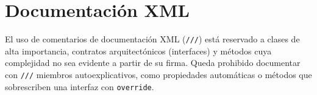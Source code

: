 \section{Documentación XML}

El uso de comentarios de documentación XML (\texttt{///}) está reservado a clases de alta importancia, contratos arquitectónicos (interfaces) y métodos cuya complejidad no sea evidente a partir de su firma. Queda prohibido documentar con \texttt{///} miembros autoexplicativos, como propiedades automáticas o métodos que sobrescriben una interfaz con \texttt{override}.



